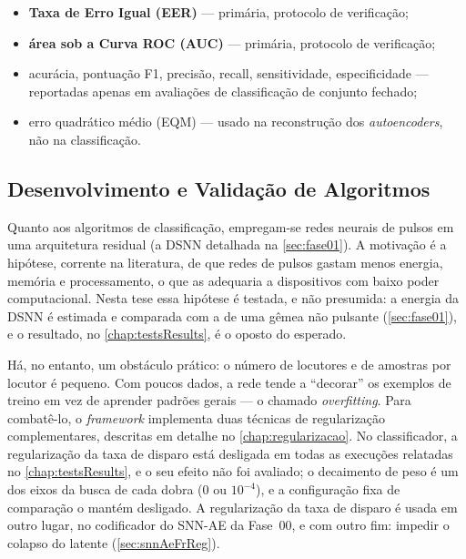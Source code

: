 			\begin{itemize}
				\item \textbf{Taxa de Erro Igual (EER)} --- primária, protocolo de verificação;
				\item \textbf{área sob a Curva ROC (AUC)} --- primária, protocolo de verificação;
				\item acurácia, pontuação F1, precisão, recall, sensitividade, especificidade --- reportadas apenas em avaliações de classificação de conjunto fechado;
				\item erro quadrático médio (EQM) --- usado na reconstrução dos \textit{autoencoders}, não na classificação.
			\end{itemize}
			
		\subsection{Desenvolvimento e Validação de Algoritmos}
		
			\par Quanto aos algoritmos de classificação, empregam-se redes neurais de pulsos em uma arquitetura residual (a \ac{DSNN} detalhada na \autoref{sec:fase01}). A motivação é a hipótese, corrente na literatura, de que redes de pulsos gastam menos energia, memória e processamento, o que as adequaria a dispositivos com baixo poder computacional. Nesta tese essa hipótese é testada, e não presumida: a energia da \ac{DSNN} é estimada e comparada com a de uma gêmea não pulsante (\autoref{sec:fase01}), e o resultado, no \autoref{chap:testsResults}, é o oposto do esperado.

			\par Há, no entanto, um obstáculo prático: o número de locutores e de amostras por locutor é pequeno. Com poucos dados, a rede tende a ``decorar'' os exemplos de treino em vez de aprender padrões gerais --- o chamado \textit{overfitting}. Para combatê-lo, o \textit{framework} implementa duas técnicas de regularização complementares, descritas em detalhe no \autoref{chap:regularizacao}. No classificador, a regularização da taxa de disparo está desligada em todas as execuções relatadas no \autoref{chap:testsResults}, e o seu efeito não foi avaliado; o decaimento de peso é um dos eixos da busca de cada dobra (0 ou $10^{-4}$), e a configuração fixa de comparação o mantém desligado. A regularização da taxa de disparo é usada em outro lugar, no codificador do \ac{SNN}-AE da Fase~00, e com outro fim: impedir o colapso do latente (\autoref{sec:snnAeFrReg}).

